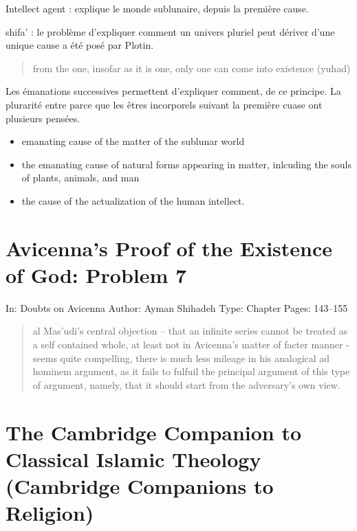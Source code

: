 Intellect agent : explique le monde sublunaire, depuis la première cause. 

shifa' : le problème d'expliquer comment un univers pluriel peut dériver d'une unique cause a été posé par Plotin. 
\begin{quote}
    from the one, insofar as it is one, only one can come into existence (yuhad)
\end{quote}
Les émanations successives permettent d'expliquer comment, de ce principe. La plurarité entre parce que les êtres incorporels suivant la première cuase ont plusieurs pensées.

\begin{Def}
\begin{itemize}
    \item emanating cause of the matter of the sublunar world
    \item the emanating cause of natural forms appearing in matter, inlcuding the souls of plants, animals, and man
    \item the cause of the actualization of the human intellect.
\end{itemize}
\end{Def}

\section{Avicenna’s Proof of the Existence of God: Problem 7}

In: Doubts on Avicenna
Author: Ayman Shihadeh
Type: Chapter
Pages: 143–155
 
 \begin{quote}
     al Mas'udi's central objection -- that an infinite series cannot be treated as a self contained whole, at least not in Avicenna's matter of facter manner - seems quite compelling, there is much less mileage in his analogical ad hominem argument, as it fails to fulfuil the principal argument of this type of argument, namely, that it should start from the adversary's own view.
 \end{quote}
 
 
 \section{The Cambridge Companion to Classical Islamic Theology (Cambridge Companions to Religion)}
 
 

